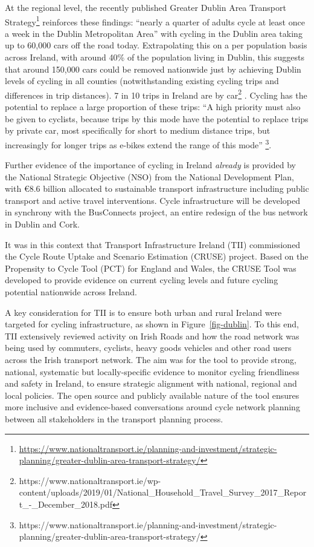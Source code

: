 \documentclass[
  super,
  preprint,
  3p]{elsarticle}
\begin{document}
At the regional level, the recently published Greater Dublin Area
Transport Strategy\footnote{\url{https://www.nationaltransport.ie/planning-and-investment/strategic-planning/greater-dublin-area-transport-strategy/}}
reinforces these findings: ``nearly a quarter of adults cycle at least
once a week in the Dublin Metropolitan Area'' with cycling in the Dublin
area taking up to 60,000 cars off the road today. Extrapolating this on
a per population basis across Ireland, with around 40\% of the
population living in Dublin, this suggests that around 150,000 cars
could be removed nationwide just by achieving Dublin levels of cycling
in all counties (notwithstanding existing cycling trips and differences
in trip distances). 7 in 10 trips in Ireland are by car\footnote{https://www.nationaltransport.ie/wp-content/uploads/2019/01/National\_Household\_Travel\_Survey\_2017\_Report\_-\_December\_2018.pdf}
. Cycling has the potential to replace a large proportion of these
trips: ``A high priority must also be given to cyclists, because trips
by this mode have the potential to replace trips by private car, most
specifically for short to medium distance trips, but increasingly for
longer trips as e-bikes extend the range of this mode'' \footnote{https://www.nationaltransport.ie/planning-and-investment/strategic-planning/greater-dublin-area-transport-strategy/}.

Further evidence of the importance of cycling in Ireland \emph{already}
is provided by the National Strategic Objective (NSO) from the National
Development Plan, with €8.6 billion allocated to sustainable transport
infrastructure including public transport and active travel
interventions. Cycle infrastructure will be developed in synchrony with
the BusConnects project, an entire redesign of the bus network in Dublin
and Cork.

It was in this context that Transport Infrastructure Ireland (TII)
commissioned the Cycle Route Uptake and Scenario Estimation (CRUSE)
project. Based on the Propensity to Cycle Tool (PCT) for England and
Wales, the CRUSE Tool was developed to provide evidence on current
cycling levels and future cycling potential nationwide across Ireland.

A key consideration for TII is to ensure both urban and rural Ireland
were targeted for cycling infrastructure, as shown in
Figure~\ref{fig-dublin}. To this end, TII extensively reviewed activity
on Irish Roads and how the road network was being used by commuters,
cyclists, heavy goods vehicles and other road users across the Irish
transport network. The aim was for the tool to provide strong, national,
systematic but locally-specific evidence to monitor cycling friendliness
and safety in Ireland, to ensure strategic alignment with national,
regional and local policies. The open source and publicly available
nature of the tool ensures more inclusive and evidence-based
conversations around cycle network planning between all stakeholders in
the transport planning process.
\end{document}
